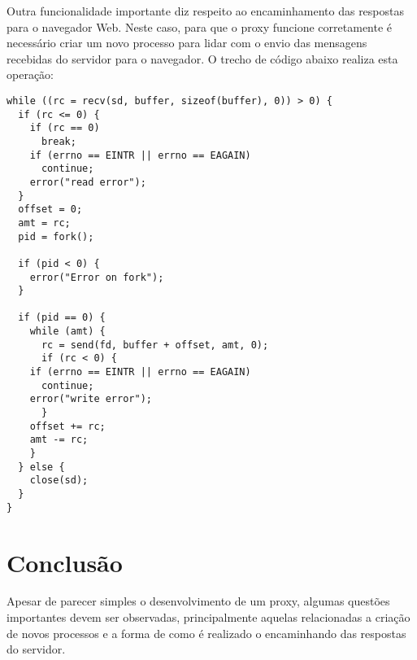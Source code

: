 \documentclass{SBCbookchapter}
\begin{document}
Outra funcionalidade importante diz respeito ao encaminhamento das respostas para o navegador Web. Neste caso, para que o proxy funcione corretamente é necessário criar um novo processo para lidar com o envio das mensagens recebidas do servidor para o navegador. O trecho de código abaixo realiza esta operação:

\begin{verbatim}
while ((rc = recv(sd, buffer, sizeof(buffer), 0)) > 0) {
  if (rc <= 0) {
    if (rc == 0)
      break;
    if (errno == EINTR || errno == EAGAIN)
      continue;
    error("read error");
  }
  offset = 0;
  amt = rc;
  pid = fork();

  if (pid < 0) {
    error("Error on fork");
  }

  if (pid == 0) {
    while (amt) {
      rc = send(fd, buffer + offset, amt, 0);
      if (rc < 0) {
	if (errno == EINTR || errno == EAGAIN)
	  continue;
	error("write error");
      }
    offset += rc;
    amt -= rc;
    }
  } else {
    close(sd);
  }
}
\end{verbatim}

\section{Conclusão}
Apesar de parecer simples o desenvolvimento de um proxy, algumas questões importantes devem ser observadas, principalmente aquelas relacionadas a criação de novos processos e a forma de como é realizado o encaminhando das respostas do servidor.
\end{document}

